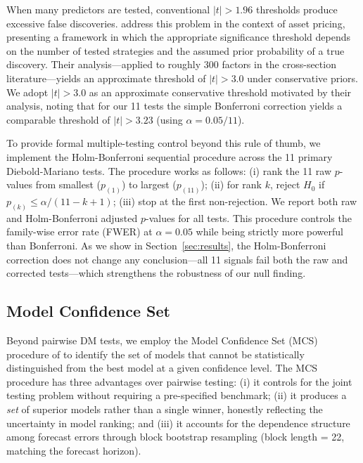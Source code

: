 \documentclass[12pt,a4paper]{article}
\begin{document}
When many predictors are tested, conventional $|t| > 1.96$ thresholds produce excessive false discoveries. \citet{harvey2016} address this problem in the context of asset pricing, presenting a framework in which the appropriate significance threshold depends on the number of tested strategies and the assumed prior probability of a true discovery. Their analysis---applied to roughly 300 factors in the cross-section literature---yields an approximate threshold of $|t| > 3.0$ under conservative priors. We adopt $|t| > 3.0$ as an approximate conservative threshold motivated by their analysis, noting that for our 11 tests the simple Bonferroni correction yields a comparable threshold of $|t| > 3.23$ (using $\alpha = 0.05/11$).

To provide formal multiple-testing control beyond this rule of thumb, we implement the Holm-Bonferroni sequential procedure \citep{holm1979} across the 11 primary Diebold-Mariano tests. The procedure works as follows: (i) rank the 11 raw $p$-values from smallest ($p_{(1)}$) to largest ($p_{(11)}$); (ii) for rank $k$, reject $H_0$ if $p_{(k)} \leq \alpha / (11 - k + 1)$; (iii) stop at the first non-rejection. We report both raw and Holm-Bonferroni adjusted $p$-values for all tests. This procedure controls the family-wise error rate (FWER) at $\alpha = 0.05$ while being strictly more powerful than Bonferroni. As we show in Section~\ref{sec:results}, the Holm-Bonferroni correction does not change any conclusion---all 11 signals fail both the raw and corrected tests---which strengthens the robustness of our null finding.

\subsection{Model Confidence Set}
\label{sec:mcs}

Beyond pairwise DM tests, we employ the Model Confidence Set (MCS) procedure of \citet{hansen2011mcs} to identify the set of models that cannot be statistically distinguished from the best model at a given confidence level. The MCS procedure has three advantages over pairwise testing: (i) it controls for the joint testing problem without requiring a pre-specified benchmark; (ii) it produces a \emph{set} of superior models rather than a single winner, honestly reflecting the uncertainty in model ranking; and (iii) it accounts for the dependence structure among forecast errors through block bootstrap resampling (block length = 22, matching the forecast horizon).
\end{document}
